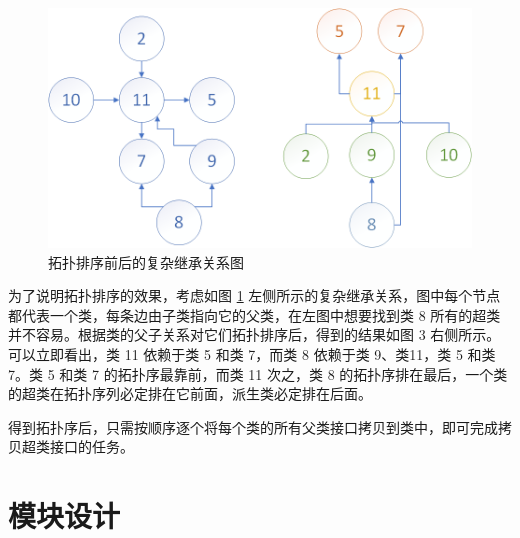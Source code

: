 \begin{figure}
  \centering
  \includegraphics[width=0.8\linewidth]{figures/拓扑排序.png}
  \caption{拓扑排序前后的复杂继承关系图}
  \label{fig:2.4}
\end{figure}

为了说明拓扑排序的效果，考虑如图 \ref{fig:2.4} 左侧所示的复杂继承关系，图中每个节点都代表一个类，每条边由子类指向它的父类，在左图中想要找到类 8 所有的超类并不容易。根据类的父子关系对它们拓扑排序后，得到的结果如图 3 右侧所示。可以立即看出，类 11 依赖于类 5 和类 7，而类 8 依赖于类 9、类11，类 5 和类 7。类 5 和类 7 的拓扑序最靠前，而类 11 次之，类 8 的拓扑序排在最后，一个类的超类在拓扑序列必定排在它前面，派生类必定排在后面。

得到拓扑序后，只需按顺序逐个将每个类的所有父类接口拷贝到类中，即可完成拷贝超类接口的任务。

\section{模块设计}

